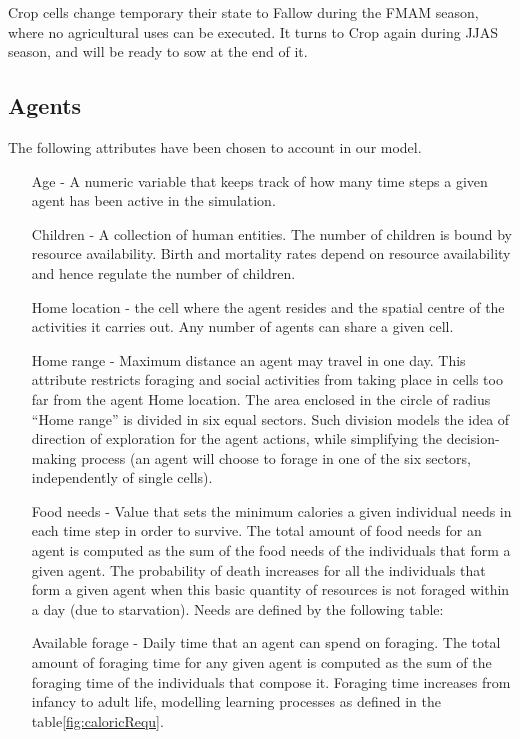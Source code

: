 \documentclass[11pt,oneside,a4paper,openright]{report}
\begin{document}
Crop cells change temporary their state to Fallow during the FMAM season, where no agricultural
uses can be executed. It turns to Crop again during JJAS season, and will be ready to sow at the end
of it.


\subsection{Agents}
\label{sec:AgentAttribs}
The following attributes have been chosen to account in our model.

\begin{enumerate}
\renewcommand{\labelitemi}{$\bullet$}
\renewcommand{\labelitemii}{$\cdot$}

\item[Age] - A numeric variable that keeps track of how many time steps a given agent has been
active in the simulation.
\item[Children] - A collection of human entities. The number of children is bound by resource
availability. Birth and mortality rates depend on resource availability and hence regulate the 
number of children.
\item[Home location] - the cell where the agent resides and the spatial centre of the activities it
carries out. Any number of agents can share a given cell.
\item[Home range] - Maximum distance an agent may travel in one day. This attribute restricts
foraging and social activities from taking place in cells too far from the agent Home location.
The area enclosed in the circle of radius “Home range” is divided in six equal sectors. Such
division models the idea of direction of exploration for the agent actions, while simplifying the
decision-making process (an agent will choose to forage in one of the six sectors,
independently of single cells).
\item[Food needs] - Value that sets the minimum calories a given individual needs in each time step
in order to survive. The total amount of food needs for an agent is computed as the sum of the
food needs of the individuals that form a given agent. The probability of death increases for all
the individuals that form a given agent when this basic quantity of resources is not foraged
within a day (due to starvation). Needs are defined by the following table:
\item[Available forage] - Daily time that an agent can spend on foraging. The total amount of
foraging time for any given agent is computed as the sum of the foraging time of the
individuals that compose it. Foraging time increases from infancy to adult life, modelling
learning processes as defined in the table\ref{fig:caloricRequ}.


\end{enumerate}
\end{document}
